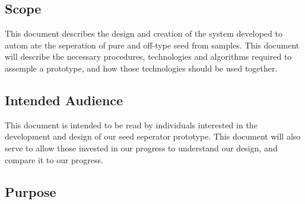 \subsection {Scope}

This document describes the design and creation of the system developed to autom
ate the seperation of pure and off-type seed from samples. 
This document will describe the necessary procedures, technologies and algorithms required to assemple a prototype, 
and how those technologies should be used together.

\subsection {Intended Audience}

This document is intended to be read by individuals interested in the development and design of our seed
seperator prototype. This document will also serve to allow those invested in our progress to understand our design,
and compare it to our progress. 

\subsection {Purpose}




